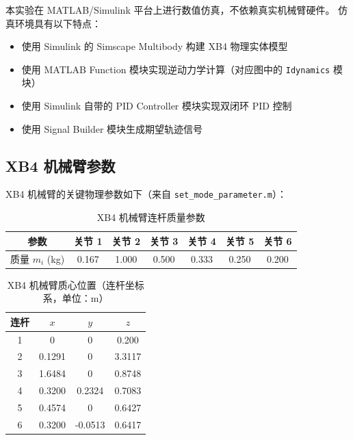 \documentclass[12pt,a4paper,oneside]{article}
\numberwithin{equation}{section}
\begin{document}
本实验在 MATLAB/Simulink 平台上进行数值仿真，不依赖真实机械臂硬件。
仿真环境具有以下特点：
\begin{itemize}
    \item 使用 Simulink 的 Simscape Multibody 构建 XB4 物理实体模型
    \item 使用 MATLAB Function 模块实现逆动力学计算（对应图中的 \texttt{Idynamics} 模块）
    \item 使用 Simulink 自带的 PID Controller 模块实现双闭环 PID 控制
    \item 使用 Signal Builder 模块生成期望轨迹信号
\end{itemize}

\subsection{XB4 机械臂参数}

XB4 机械臂的关键物理参数如下（来自 \texttt{set\_mode\_parameter.m}）：

\begin{table}[H]
    \centering
    \caption{XB4 机械臂连杆质量参数}
    \begin{tabular}{ccccccc}
        \toprule
        \textbf{参数} & 关节 1 & 关节 2 & 关节 3 & 关节 4 & 关节 5 & 关节 6 \\
        \midrule
        质量 $m_i$ (kg) & 0.167 & 1.000 & 0.500 & 0.333 & 0.250 & 0.200 \\
        \bottomrule
    \end{tabular}
\end{table}

\begin{table}[H]
    \centering
    \caption{XB4 机械臂质心位置（连杆坐标系，单位：m）}
    \begin{tabular}{cccc}
        \toprule
        \textbf{连杆} & \textbf{$x$} & \textbf{$y$} & \textbf{$z$} \\
        \midrule
        1 & 0     & 0     & 0.200  \\
        2 & 0.1291& 0     & 3.3117 \\
        3 & 1.6484& 0     & 0.8748 \\
        4 & 0.3200& 0.2324& 0.7083 \\
        5 & 0.4574& 0     & 0.6427 \\
        6 & 0.3200& -0.0513& 0.6417 \\
        \bottomrule
    \end{tabular}
\end{table}
\end{document}
